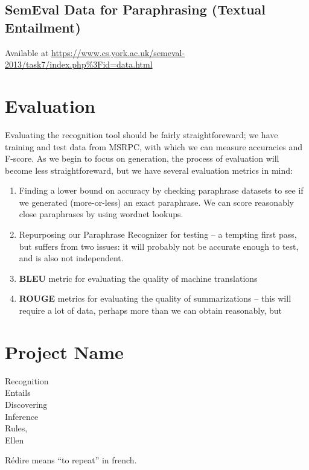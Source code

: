 \documentclass[11pt, reqno]{amsart}
\begin{document}
	\subsection{SemEval Data for Paraphrasing (Textual Entailment) }
	
	Available at \url{https://www.cs.york.ac.uk/semeval-2013/task7/index.php%3Fid=data.html}
		
	\section{Evaluation}
	Evaluating the recognition tool should be fairly straightforeward; we have training and test data from MSRPC, with which we can measure accuracies and F-score. As we begin to focus on generation, the process of evaluation will become less straightforeward, but we have several evaluation metrics in mind:
	\begin{enumerate}
		\item Finding a lower bound on accuracy by checking paraphrase datasets to see if we generated (more-or-less) an exact paraphrase. We can score reasonably close paraphrases by using wordnet lookups.
		\item Repurposing our Paraphrase Recognizer for testing -- a tempting first pass, but suffers from two issues: it will probably not be accurate enough to test, and is also not independent. 
		\item \textbf{BLEU} metric for evaluating the quality of machine translations
		\item \textbf{ROUGE} metrics for evaluating the quality of summarizations -- this will require a lot of data, perhaps more than we can obtain reasonably, but 
	\end{enumerate}

	\section{Project Name}
	\begin{minipage}{10em}
		\noindent Recognition \\
		Entails \\
		Discovering \\
		Inference \\
		Rules, \\
		Ellen 
	\end{minipage}
	R\'{e}dire means ``to repeat'' in french.
	
	
\end{document}
